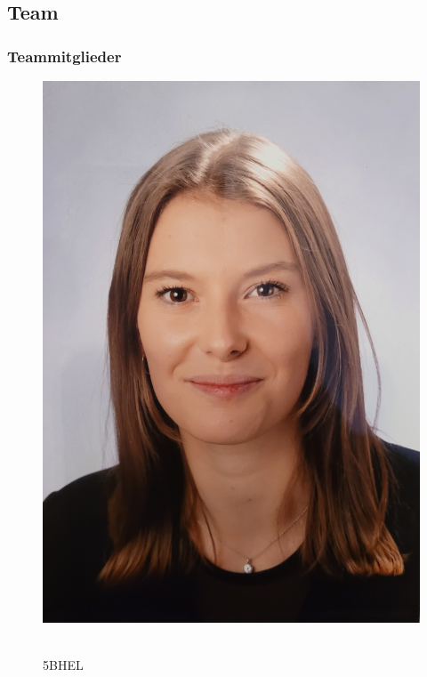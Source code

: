 \subsection{ Team}
\subsubsection{Teammitglieder}

\begin{figure}[h]
  \centering
  \begin{adjustbox}{valign=c}
    \includegraphics[scale=0.06]{image/Sophia.jpg}
  \end{adjustbox}
  \hfill
  \begin{minipage}[b]{0.7\textwidth}
    \textbf{\nameSH} \\ 5BHEL
  \end{minipage}
  \captionsetup{justification=raggedright,singlelinecheck=false}
  \caption{\nameSH}
\end{figure}

